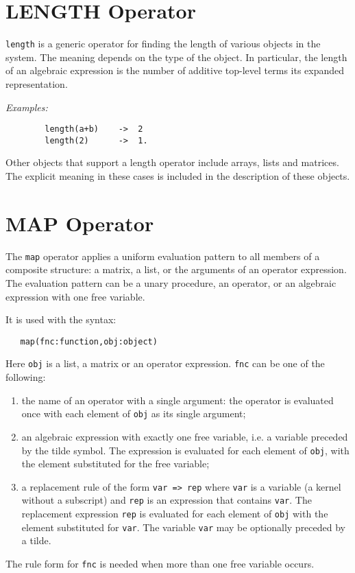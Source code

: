 \section{LENGTH Operator}
\hypertarget{operator:LENGTH}{}
\texttt{length} is a generic operator for finding the
length of various objects in the system.  The meaning depends on the type
of the object.  In particular, the length of an algebraic expression is
the number of additive top-level terms its expanded representation.

\textit{Examples:}
\begin{verbatim}
        length(a+b)    ->  2
        length(2)      ->  1.
\end{verbatim}
Other objects that support a length operator include arrays, lists and
matrices. The explicit meaning in these cases is included in the description
of these objects.



\section{MAP Operator}
\hypertarget{operator:MAP}{}

The \texttt{map} operator applies a uniform evaluation pattern to all members
of a composite structure: a matrix, a list, or the arguments of an
operator expression.  The evaluation pattern can be a unary procedure, an
operator, or an algebraic expression with one free variable.

It is used with the syntax:
\begin{verbatim}
   map(fnc:function,obj:object)
\end{verbatim}
Here \texttt{obj} is a list, a matrix or an operator expression.
\texttt{fnc} can be one of the following:
\begin{enumerate}
\item the name of an operator with a single argument: the operator
is evaluated once with each element of \texttt{obj} as its single argument;
\item an algebraic expression with exactly one free variable, i.e.
a variable preceded by the tilde symbol. The expression
is evaluated for each element of \texttt{obj}, with the element
substituted for the free variable;
\item a replacement rule of the form \texttt{var => rep}
where \texttt{var} is a variable (a kernel without a subscript)
and \texttt{rep} is an expression that contains \texttt{var}.
The replacement expression \texttt{rep} is evaluated for each element of
\texttt{obj} with
the element substituted for  \texttt{var}. The variable \texttt{var} may be
optionally preceded by a tilde.
\end{enumerate}
The rule form  for \texttt{fnc} is needed when more than
one free variable occurs.

